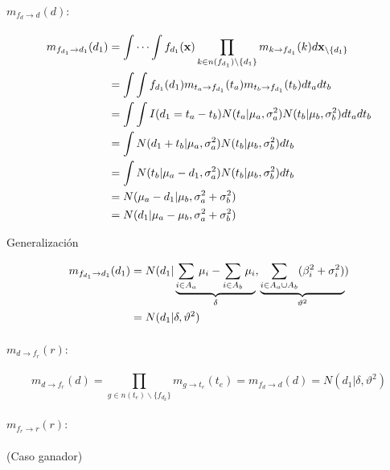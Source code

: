 \documentclass[11pt,twoside, spanish]{report} %
\begin{document}
\paragraph{$m_{f_{d}\rightarrow d}(d):$}

\begin{equation}
	\centering
	\begin{split}
		m_{f_{d_1}\rightarrow d_1}(d_1) & = \int\cdots\int f_{d_1}(\textbf{x})\prod_{k\in n(f_{d_1})\backslash\{d_1\}} m_{k\rightarrow f_{d_1}}(k)d\textbf{x}_{\backslash \{d_1\}} \\
		& = \int\int f_{d_1}(d_1)m_{t_a\rightarrow f_{d_1}}(t_a)m_{t_b\rightarrow f_{d_1}}(t_b)dt_adt_b\\
		& = \int\int I(d_1=t_a-t_b)N(t_a \vert \mu_a,\sigma_a^2)N(t_b \vert \mu_b,\sigma_b^2)dt_adt_b\\
		& =\int N(d_1+t_b \vert \mu_a,\sigma_a^2)N(t_b \vert \mu_b,\sigma_b^2)dt_b\\
		& =\int N(t_b \vert \mu_a-d_1,\sigma_a^2)N(t_b \vert \mu_b,\sigma_b^2)dt_b\\
		& =N( \mu_a-d_1 \vert  \mu_b,\sigma_a^2+\sigma_b^2)\\
		& =N(d_1 \vert  \mu_a-\mu_b,\sigma_a^2+\sigma_b^2)
	\end{split}
\end{equation}

Generalizaci\'on

\begin{equation}
	\centering
	\begin{split}
		m_{f_{d_1}\rightarrow d_1}(d_1)& = N(d_1 \vert  \underbrace{\sum_{i\in A_a}\mu_i-\sum_{i\in A_b}\mu_i}_{\delta},\underbrace{\sum_{i\in A_a \cup A_b}(\beta_i^2+\sigma_i^2)}_{\vartheta^2})\\
		& =  N(d_1 \vert  \delta,\vartheta^2)
	\end{split}
\end{equation}


\paragraph{$m_{d \rightarrow f_r}(r):$}

\begin{equation}
	m_{d \rightarrow f_r}(d) = \prod_{g\in n(t_e)\backslash\{f_{d_k}\}} m_{g \rightarrow t_e} (t_e)
	= m_{f_d \rightarrow d}(d)= N(d_1 \vert \delta, \vartheta^2)
\end{equation}

\paragraph{$m_{f_r \rightarrow r}(r):$} (Caso ganador)
\end{document}
